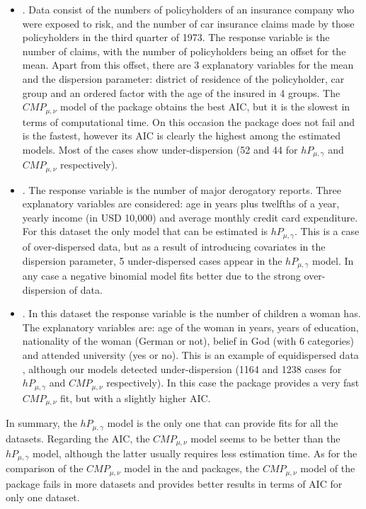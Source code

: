 \begin{itemize}
    \item {}. Data consist of the numbers of policyholders of an insurance company who were exposed to risk, and the number of car insurance claims made by those policyholders in the third quarter of 1973. The response variable is the number of claims, with the number of policyholders being an offset for the mean. Apart from this offset, there are 3 explanatory variables for the mean and the dispersion parameter: district of residence of the policyholder, car group and an ordered factor with the age of the insured in 4 groups. The $CMP_{\mu, \nu}$ model of the  package obtains the best AIC, but it is the slowest in terms of computational time. On this occasion the  package does not fail and is the fastest, however its AIC is clearly the highest among the estimated models. Most of the cases show under-dispersion (52 and 44 for $hP_{\mu, \gamma}$ and $CMP_{\mu, \nu}$ respectively).

    \item {}. The response variable is the number of major derogatory reports. Three explanatory variables are considered: age in years plus twelfths of a year, yearly income (in USD 10,000) and average monthly credit card expenditure. For this dataset the only model that can be estimated is $hP_{\mu, \gamma}$. This is a case of over-dispersed data, but as a result of introducing covariates in the dispersion parameter, 5 under-dispersed cases appear in the $hP_{\mu, \gamma}$ model. In any case a negative binomial model fits better due to the strong over-dispersion of data.

    \item {}.  In this dataset the response variable is the number of children a woman has. The explanatory variables are: age of the woman in years, years of education, nationality of the woman (German or not), belief in God (with 6 categories) and attended university (yes or no). This is an example of equidispersed data \citep{tutz_2011}, although our models detected under-dispersion (1164 and 1238 cases for $hP_{\mu, \gamma}$ and $CMP_{\mu, \nu}$ respectively). In this case the  package provides a very fast $CMP_{\mu, \nu}$ fit, but with a slightly higher AIC.

\end{itemize}

In summary, the $hP_{\mu, \gamma}$ model is the only one that can provide fits for all the datasets. Regarding the AIC, the $CMP_{\mu, \nu}$ model seems to be better than the $hP_{\mu, \gamma}$ model, although the latter usually requires less estimation time. As for the comparison of the $CMP_{\mu, \nu}$ model in the  and  packages, the $CMP_{\mu, \nu}$ model of the  package fails in more datasets and provides better results in terms of AIC for only one dataset.


